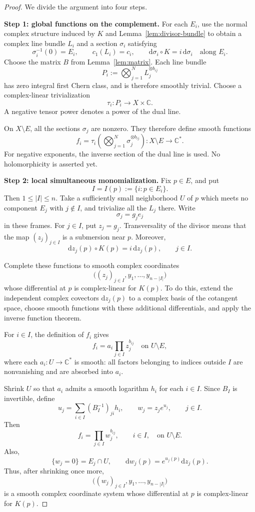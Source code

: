 \documentclass[11pt]{amsart}
\theoremstyle{definition}
\theoremstyle{remark}
\newcommand{\C}{\mathbb C}
\newcommand{\dd}{\mathrm d}
\begin{document}
\begin{proof}
We divide the argument into four steps.

\medskip
\noindent\textbf{Step 1: global functions on the complement.}
For each $E_i$, use the normal complex structure induced by $K$
and Lemma~\ref{lem:divisor-bundle} to obtain a complex line bundle
$L_i$ and a section $\sigma_i$ satisfying
\[
\sigma_i^{-1}(0)=E_i,\qquad
c_1(L_i)=c_i,\qquad
\dd\sigma_i\circ K=i\,\dd\sigma_i\quad\text{along }E_i.
\]
Choose the matrix $B$ from Lemma~\ref{lem:matrix}.  Each line
bundle
\[
P_i:=\bigotimes_{j=1}^{N}L_j^{\otimes b_{ij}}
\]
has zero integral first Chern class, and is therefore smoothly
trivial.  Choose a complex-linear trivialization
\[
\tau_i:P_i\longrightarrow X\times\C.
\]
A negative tensor power denotes a power of the dual line.

On $X\setminus E$, all the sections $\sigma_j$ are nonzero.
They therefore define smooth functions
\[
f_i
=
\tau_i\!\left(\bigotimes_{j=1}^{N}\sigma_j^{\otimes b_{ij}}\right)
:
X\setminus E\longrightarrow\C^*.
\]
For negative exponents, the inverse section of the dual line
is used.  No holomorphicity is asserted yet.

\medskip
\noindent\textbf{Step 2: local simultaneous monomialization.}
Fix $p\in E$, and put
\[
I=I(p):=\{i:p\in E_i\}.
\]
Then $1\leq |I|\leq n$.  Take a sufficiently small neighborhood
$U$ of $p$ which meets no component $E_j$ with $j\notin I$,
and trivialize all the $L_j$ there.  Write
\[
\sigma_j=g_j e_j
\]
in these frames.  For $j\in I$, put $z_j=g_j$.
Transversality of the divisor means that the map
$(z_j)_{j\in I}$ is a submersion near $p$.  Moreover,
\[
\dd z_j(p)\circ K(p)=i\,\dd z_j(p),\qquad j\in I.
\]

Complete these functions to smooth complex coordinates
\[
\bigl((z_j)_{j\in I},y_1,\ldots,y_{n-|I|}\bigr)
\]
whose differential at $p$ is complex-linear for $K(p)$.
To do this, extend the independent complex covectors
$\dd z_j(p)$ to a complex basis of the cotangent space, choose
smooth functions with these additional differentials, and
apply the inverse function theorem.

For $i\in I$, the definition of $f_i$ gives
\[
f_i=a_i\prod_{j\in I}z_j^{b_{ij}}
\quad\text{on }U\setminus E,
\]
where each $a_i:U\to\C^*$ is smooth: all factors belonging to
indices outside $I$ are nonvanishing and are absorbed into
$a_i$.

Shrink $U$ so that $a_i$ admits a smooth logarithm $h_i$ for
each $i\in I$.  Since $B_I$ is invertible, define
\[
u_j=\sum_{i\in I}(B_I^{-1})_{ji}h_i,\qquad
w_j=z_j e^{u_j},\qquad j\in I.
\]
Then
\begin{equation}\label{eq:monomial}
f_i=\prod_{j\in I}w_j^{b_{ij}},
\qquad i\in I,
\quad\text{on }U\setminus E.
\end{equation}
Also,
\[
\{w_j=0\}=E_j\cap U,\qquad
\dd w_j(p)=e^{u_j(p)}\dd z_j(p).
\]
Thus, after shrinking once more,
\[
\bigl((w_j)_{j\in I},y_1,\ldots,y_{n-|I|}\bigr)
\]
is a smooth complex coordinate system whose differential at
$p$ is complex-linear for $K(p)$.


\end{proof}
\end{document}

